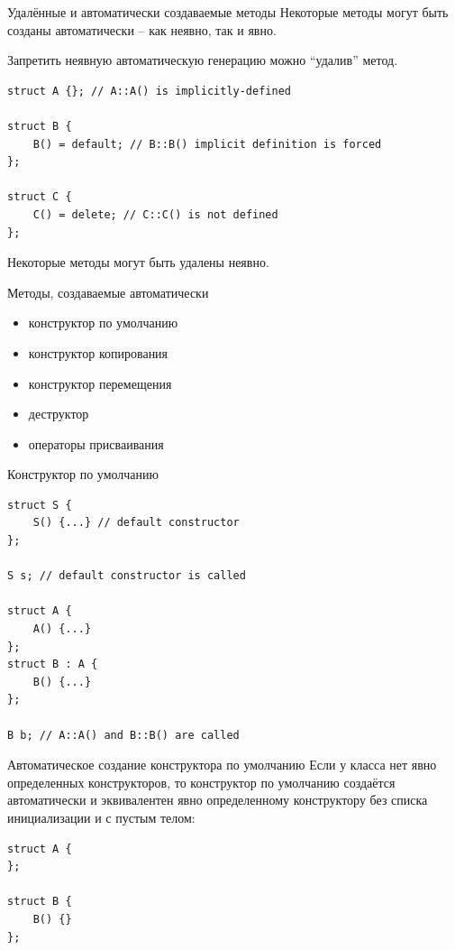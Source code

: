 \documentclass[unknownkeysallowed,xcolor=table]{beamer}
\begin{document}
\begin{frame}[fragile]{Удалённые и автоматически создаваемые методы}
Некоторые методы могут быть созданы автоматически -- как неявно, так и явно.

\vspace{0.5em}

Запретить неявную автоматическую генерацию можно ``удалив'' метод.
\begin{lstlisting}
struct A {}; // A::A() is implicitly-defined

struct B {
    B() = default; // B::B() implicit definition is forced
};

struct C {
    C() = delete; // C::C() is not defined
};
\end{lstlisting}
Некоторые методы могут быть удалены неявно.
\end{frame}

\begin{frame}{Методы, создаваемые автоматически}
\begin{itemize}
  \item конструктор по умолчанию \vspace{1em}
  \item конструктор копирования \vspace{1em}
  \item конструктор перемещения \vspace{1em}
  \item деструктор \vspace{1em}
  \item операторы присваивания
\end{itemize}
\end{frame}

\begin{frame}[fragile]{Конструктор по умолчанию}
\begin{lstlisting}
struct S {
    S() {...} // default constructor
};

S s; // default constructor is called

struct A {
    A() {...}
};
struct B : A {
    B() {...}
};

B b; // A::A() and B::B() are called
\end{lstlisting}
\end{frame}

\begin{frame}[fragile]{Автоматическое создание конструктора по умолчанию}
Если у класса нет явно определенных конструкторов, то конструктор по умолчанию создаётся автоматически и эквивалентен явно определенному конструктору без списка инициализации и с пустым телом:
\begin{lstlisting}
struct A {
};

struct B {
    B() {}
};
\end{lstlisting}
\end{frame}
\end{document}
